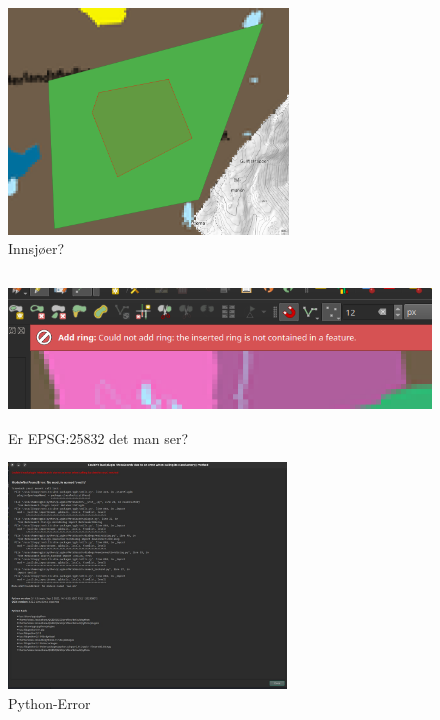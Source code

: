 \begin{frame}
    \begin{figure}
        \centering
        \includegraphics[height = 6cm]{images/qgis_shapeInShape.png}%
        \caption{Innsjøer?}
    \end{figure}
\end{frame}

\begin{frame}
    \begin{figure}
        \centering
        \includegraphics[height = 4cm]{images/qgis_ringInRing.png}%
        \caption{Er EPSG:25832 det man ser?}
    \end{figure}
\end{frame}

\begin{frame}
    \begin{figure}
        \centering
        \includegraphics[height = 6cm]{images/qgis_pythonerror.jpg}%
        \caption{Python-Error}
    \end{figure}
\end{frame}

